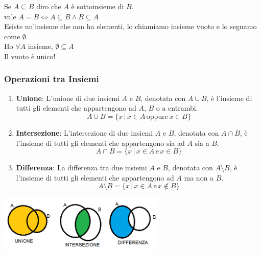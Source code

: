 \vspace{1em}
Se $A\subseteq B$ diro che $A$ è sottoinsieme di $B$.   \\
\vspace{1em}
vale $A=B\iff A\subseteq B\land B\subseteq A$   \\
Esiste un'insieme che non ha elementi, lo chiamiamo insieme vuoto e lo segnamo come $\emptyset$.    \\
Ho $\forall A$ insieme, $\emptyset \subseteq A$ \\
Il vuoto è unico!

\subsubsection{Operazioni tra Insiemi}
\begin{enumerate}
    \item \textbf{Unione}: L'unione di due insiemi \( A \) e \( B \), denotata con \( A \cup B \), è l'insieme di tutti gli elementi che appartengono ad \( A \), \( B \) o a entrambi.
    \[A \cup B = \{x \, | \, x \in A \, \text{oppure} \, x \in B\}
    \]
    
    \item \textbf{Intersezione}: L'intersezione di due insiemi \( A \) e \( B \), denotata con \( A \cap B \), è l'insieme di tutti gli elementi che appartengono sia ad \( A \) sia a \( B \).
    \[
    A \cap B = \{x \, | \, x \in A \, \text{e} \, x \in B\}
    \]
    
    \item \textbf{Differenza}: La differenza tra due insiemi \( A \) e \( B \), denotata con \( A \setminus B \), è l'insieme di tutti gli elementi che appartengono ad \( A \) ma non a \( B \).
    \[
    A \setminus B = \{x \, | \, x \in A \, \text{e} \, x \notin B\}
    \]
    \end{enumerate}
\begin{center}
     \includegraphics[width=0.6\textwidth]{img/chap_1/unione_intersezione_differenza.png}
\end{center}



    

    
    
    
